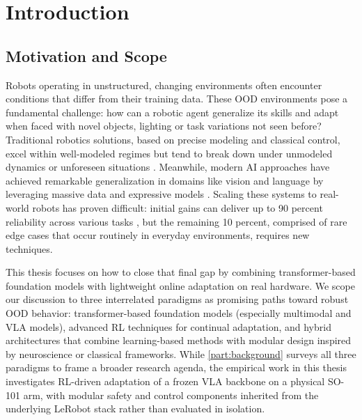 
\begingroup
\let\clearpage\relax
\let\cleardoublepage\relax
\chapter{Introduction}
\label{sec:intro}
\endgroup

\section{Motivation and Scope}

Robots operating in unstructured, changing environments often encounter conditions that differ from their training data. These \ac{OOD} environments pose a fundamental challenge: how can a robotic agent generalize its skills and adapt when faced with novel objects, lighting or task variations not seen before? Traditional robotics solutions, based on precise modeling and classical control, excel within well-modeled regimes but tend to break down under unmodeled dynamics or unforeseen situations \cite{RLSURVEY2013}. Meanwhile, modern \ac{AI} approaches have achieved remarkable generalization in domains like vision and language by leveraging massive data and expressive models \cite{RT12022, GATO2022, RT22023, PALM2023, OPENVLA2024, PI0.52025, HELIX2025, GR00T2025, GEMER2025}. Scaling these systems to real-world robots has proven difficult: initial gains can deliver up to 90 percent reliability across various tasks \cite{RT12022}, but the remaining 10 percent, comprised of rare edge cases that occur routinely in everyday environments, requires new techniques.

This thesis focuses on how to close that final gap by combining transformer-based foundation models with lightweight online adaptation on real hardware. We scope our discussion to three interrelated paradigms as promising paths toward robust \ac{OOD} behavior: transformer-based foundation models (especially multimodal and \ac{VLA} models), advanced \ac{RL} techniques for continual adaptation, and hybrid architectures that combine learning-based methods with modular design inspired by neuroscience or classical frameworks. While \cref{part:background} surveys all three paradigms to frame a broader research agenda, the empirical work in this thesis investigates \ac{RL}-driven adaptation of a frozen \ac{VLA} backbone on a physical SO-101 arm, with modular safety and control components inherited from the underlying LeRobot stack rather than evaluated in isolation.

